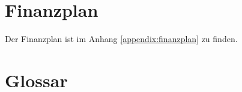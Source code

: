 \clearpage
\appendix

\section{Finanzplan}

Der Finanzplan ist im Anhang \ref{appendix:finanzplan} zu finden.

\listoffigures

\listoftables

 


\section{Glossar}
\renewcommand{\glossarysection}[2][]{}
\printglossary
\glsaddall

\label{appendix:finanzplan}



